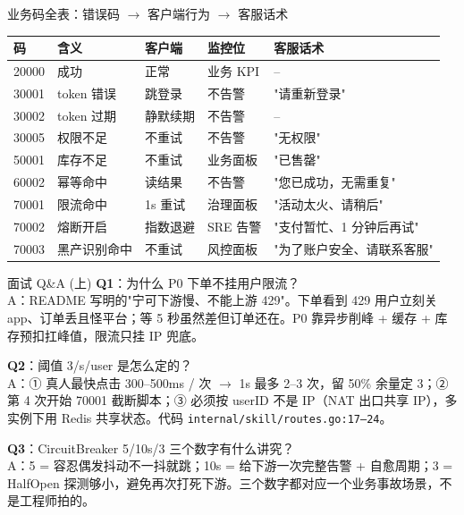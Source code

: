 \documentclass[aspectratio=169,11pt]{beamer}
\begin{document}
\begin{frame}[shrink]{业务码全表：错误码 $\to$ 客户端行为 $\to$ 客服话术}
\footnotesize
\begin{tabular}{@{}lllll@{}}
\toprule
码 & 含义 & 客户端 & 监控位 & 客服话术 \\
\midrule
20000 & 成功         & 正常        & 业务 KPI    & --                        \\
30001 & token 错误   & 跳登录      & 不告警      & "请重新登录"              \\
30002 & token 过期   & 静默续期    & 不告警      & --                        \\
30005 & 权限不足     & 不重试      & 不告警      & "无权限"                  \\
50001 & 库存不足     & 不重试      & 业务面板    & "已售罄"                  \\
60002 & 幂等命中     & 读结果      & 不告警      & "您已成功，无需重复"      \\
70001 & 限流命中     & 1s 重试     & 治理面板    & "活动太火、请稍后"        \\
70002 & 熔断开启     & 指数退避    & SRE 告警    & "支付暂忙、1 分钟后再试"  \\
70003 & 黑产识别命中 & 不重试      & 风控面板    & "为了账户安全、请联系客服" \\
\bottomrule
\end{tabular}
\vspace{1mm}
\end{frame}

\appendix

\begin{frame}[shrink]{面试 Q\&A (上)}
\textbf{Q1}：为什么 P0 下单不挂用户限流？\\
\hspace{4mm}\small A：README 写明的"宁可下游慢、不能上游 429"。下单看到 429 用户立刻关 app、订单丢且怪平台；等 5 秒虽然差但订单还在。P0 靠异步削峰 + 缓存 + 库存预扣扛峰值，限流只挂 IP 兜底。

\vspace{2mm}
\textbf{Q2}：阈值 3/s/user 是怎么定的？\\
\hspace{4mm}\small A：① 真人最快点击 300--500ms / 次 $\to$ 1s 最多 2--3 次，留 50\% 余量定 3；② 第 4 次开始 70001 截断脚本；③ 必须按 userID 不是 IP（NAT 出口共享 IP），多实例下用 Redis 共享状态。代码 \texttt{internal/skill/routes.go:17--24}。

\vspace{2mm}
\textbf{Q3}：CircuitBreaker 5/10s/3 三个数字有什么讲究？\\
\hspace{4mm}\small A：5 = 容忍偶发抖动不一抖就跳；10s = 给下游一次完整告警 + 自愈周期；3 = HalfOpen 探测够小，避免再次打死下游。三个数字都对应一个业务事故场景，不是工程师拍的。
\end{frame}
\end{document}

